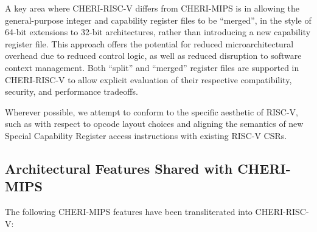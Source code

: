 A key area where CHERI-RISC-V differs from CHERI-MIPS is in allowing the
general-purpose integer and capability register files to be ``merged'', in the
style of 64-bit extensions to 32-bit architectures, rather than introducing a
new capability register file.
This approach offers the potential for reduced microarchitectural overhead due
to reduced control logic, as well as reduced disruption to software context
management.
Both ``split'' and ``merged'' register files are supported in CHERI-RISC-V to
allow explicit evaluation of their respective compatibility, security, and
performance tradeoffs.

%

Wherever possible, we attempt to conform to the specific aesthetic of RISC-V,
such as with respect to opcode layout choices and aligning the semantics of
new Special Capability Register access instructions with existing RISC-V CSRs.


\subsection{Architectural Features Shared with CHERI-MIPS}

The following CHERI-MIPS features have been transliterated into CHERI-RISC-V:

